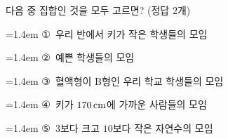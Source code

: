 다음 중 집합인 것을 모두 고르면? (정답 $2$개)
\par\medskip\par\noindent\hangindent=1.4em {\small ①}\ 우리 반에서 키가 작은 학생들의 모임\par\noindent\hangindent=1.4em {\small ②}\ 예쁜 학생들의 모임\par\noindent\hangindent=1.4em {\small ③}\ 혈액형이 $\mathrm{B}$형인 우리 학교 학생들의 모임\par\noindent\hangindent=1.4em {\small ④}\ 키가 $170\mkern3mu \mathrm{cm}$에 가까운 사람들의 모임\par\noindent\hangindent=1.4em {\small ⑤}\ $3$보다 크고 $10$보다 작은 자연수의 모임\par\medskip
